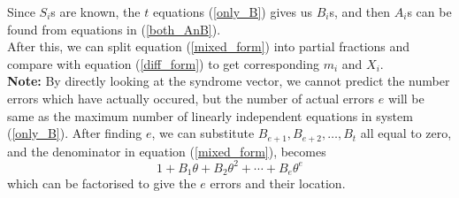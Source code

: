 \documentclass[../main.tex]{subfiles}
\begin{document}
Since $S_i$s are known, the $t$ equations (\ref{only_B}) gives us $B_{i}$s, and then $A_i$s can be found from equations in (\ref{both_AnB}).\\
After this, we can split equation (\ref{mixed_form}) into partial fractions and compare with equation (\ref{diff_form}) to get corresponding $m_i$ and $X_i$.\\

\textbf{Note:} By directly looking at the syndrome vector, we cannot predict the number errors which have actually occured, but the number of actual errors $e$ will be same as the maximum number of linearly independent equations in system (\ref{only_B}). After finding $e$, we can substitute $B_{e+1},B_{e+2},\ldots,B_t$ all equal to zero, and the denominator in equation (\ref{mixed_form}), becomes
\[
	1 + B_1\theta + B_2\theta^2 + \cdots + B_e\theta^e
\]
which can be factorised to give the $e$ errors and their location.
\end{document}
